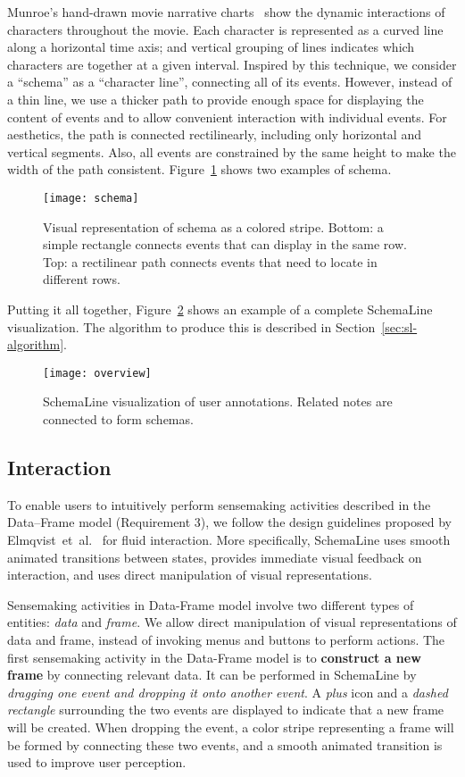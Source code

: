 Munroe's hand-drawn movie narrative charts~\cite{Munroe2009} show the dynamic interactions of characters throughout the movie. Each character is represented as a curved line along a horizontal time axis; and vertical grouping of lines indicates which characters are together at a given interval. Inspired by this technique, we consider a ``schema'' as a ``character line'', connecting all of its events. However, instead of a thin line, we use a thicker path to provide enough space for displaying the content of events and to allow convenient interaction with individual events. For aesthetics, the path is connected rectilinearly, including only horizontal and vertical segments. Also,  all events are constrained by the same height to make the width of the path consistent. Figure~\ref{fig:schema} shows two examples of schema. 

\begin{figure}[!htb]
	\centering
	\texttt{[image: schema]}
	\caption{Visual representation of schema as a colored stripe. Bottom: a simple rectangle connects events that can display in the same row. Top: a rectilinear path connects events that need to locate in different rows.}
	\label{fig:schema}
\end{figure}

Putting it all together, Figure~\ref{fig:sl-overview} shows an example of a complete SchemaLine visualization. The algorithm to produce this is described in Section~\ref{sec:sl-algorithm}.

\begin{figure}[!htb]
	\centering
	\texttt{[image: overview]}
	\caption{SchemaLine visualization of user annotations. Related notes are connected to form schemas.}
	\label{fig:sl-overview}
\end{figure}

\subsection{Interaction}
To enable users to intuitively perform sensemaking activities described in the Data--Frame model (Requirement 3), we follow the design guidelines proposed by Elmqvist~et~al.~\cite{Elmqvist2011} for fluid interaction. More specifically, SchemaLine uses smooth animated transitions between states, provides immediate visual feedback on interaction, and uses direct manipulation of visual representations.

Sensemaking activities in Data-Frame model involve two different types of entities: \textit{data} and \textit{frame}. We allow direct manipulation of visual representations of data and frame, instead of invoking menus and buttons to perform actions. The first sensemaking activity in the Data-Frame model is to \textbf{construct a new frame} by connecting relevant data. It can be performed in SchemaLine by \textit{dragging one event and dropping it onto another event}. A \textit{plus} icon and a \textit{dashed rectangle} surrounding the two events are displayed to indicate that a new frame will be created. When dropping the event, a color stripe representing a frame will be formed by connecting these two events, and a smooth animated transition is used to improve user perception.

